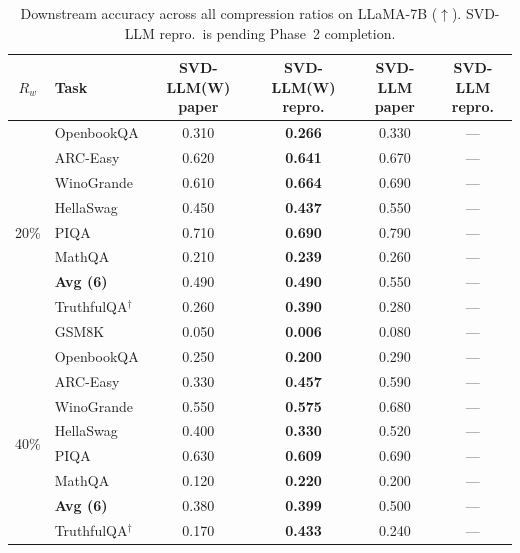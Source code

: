 \documentclass[11pt,a4paper]{article}
\theoremstyle{remark}
\begin{document}
\begin{table}[H]
\centering
\caption{Downstream accuracy across all compression ratios on LLaMA-7B ($\uparrow$).
SVD-LLM repro.\ is pending Phase~2 completion.}
\label{tab:downstream}
\footnotesize
\setlength{\tabcolsep}{3.6pt}
\begin{tabular}{@{}cl cccc@{}}
\toprule
$R_w$ & \textbf{Task}
  & \shortstack{SVD-LLM(W)\\paper}
  & \shortstack{\textbf{SVD-LLM(W)}\\\textbf{repro.}}
  & \shortstack{SVD-LLM\\paper}
  & \shortstack{\textbf{SVD-LLM}\\\textbf{repro.}} \\
\midrule
\multirow{9}{*}{20\%}
  & OpenbookQA           & 0.310 & \textbf{0.266} & 0.330 & --- \\
  & ARC-Easy             & 0.620 & \textbf{0.641} & 0.670 & --- \\
  & WinoGrande           & 0.610 & \textbf{0.664} & 0.690 & --- \\
  & HellaSwag            & 0.450 & \textbf{0.437} & 0.550 & --- \\
  & PIQA                 & 0.710 & \textbf{0.690} & 0.790 & --- \\
  & MathQA               & 0.210 & \textbf{0.239} & 0.260 & --- \\
  \cmidrule(l){2-6}
  & \textbf{Avg (6)}     & 0.490 & \textbf{0.490} & 0.550 & --- \\
  & TruthfulQA$^\dagger$ & 0.260 & \textbf{0.390} & 0.280 & --- \\
  & GSM8K                & 0.050 & \textbf{0.006} & 0.080 & --- \\
\midrule
\multirow{9}{*}{40\%}
  & OpenbookQA           & 0.250 & \textbf{0.200} & 0.290 & --- \\
  & ARC-Easy             & 0.330 & \textbf{0.457} & 0.590 & --- \\
  & WinoGrande           & 0.550 & \textbf{0.575} & 0.680 & --- \\
  & HellaSwag            & 0.400 & \textbf{0.330} & 0.520 & --- \\
  & PIQA                 & 0.630 & \textbf{0.609} & 0.690 & --- \\
  & MathQA               & 0.120 & \textbf{0.220} & 0.200 & --- \\
  \cmidrule(l){2-6}
  & \textbf{Avg (6)}     & 0.380 & \textbf{0.399} & 0.500 & --- \\
  & TruthfulQA$^\dagger$ & 0.170 & \textbf{0.433} & 0.240 & --- \\

\end{tabular}
\end{table}
\end{document}
